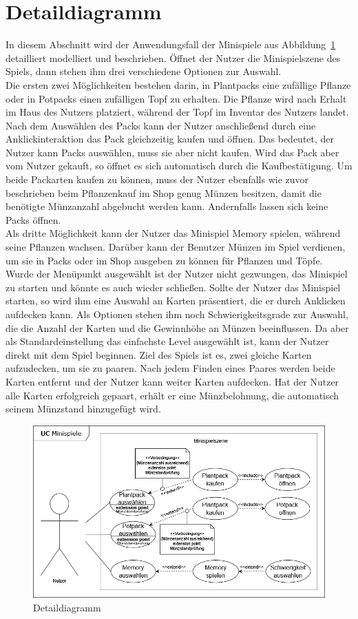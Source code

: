 \section{Detaildiagramm}\label{sec:detaildiagramme}
In diesem Abschnitt wird der Anwendungsfall der Minispiele aus Abbildung~\ref{fig:uc_detail} detailliert modelliert und 
beschrieben.
Öffnet der Nutzer die Minispielszene des Spiels, dann stehen ihm drei verschiedene Optionen zur Auswahl.\\
\newline
Die ersten zwei Möglichkeiten bestehen darin, in Plantpacks eine zufällige Pflanze oder in Potpacks einen zufälligen 
Topf zu erhalten. 
Die Pflanze wird nach Erhalt im Haus des Nutzers platziert, während der Topf im Inventar des Nutzers landet.
Nach dem Auswählen des Packs kann der Nutzer anschließend durch eine Anklickinteraktion das Pack gleichzeitig kaufen
und öffnen. 
Das bedeutet, der Nutzer kann Packs auswählen, muss sie aber nicht kaufen.
Wird das Pack aber vom Nutzer gekauft, so öffnet es sich automatisch durch die Kaufbestätigung. 
Um beide Packarten kaufen zu können, muss der Nutzer ebenfalls wie zuvor beschrieben beim Pflanzenkauf im Shop genug 
Münzen besitzen, damit die benötigte Münzanzahl abgebucht werden kann. 
Andernfalls lassen sich keine Packs öffnen.\\
\newpage
Als dritte Möglichkeit kann der Nutzer das Minispiel Memory spielen, während seine Pflanzen wachsen. 
Darüber kann der Benutzer Münzen im Spiel verdienen, um sie in Packs oder im Shop ausgeben zu können für Pflanzen und 
Töpfe.
Wurde der Menüpunkt ausgewählt ist der Nutzer nicht gezwungen, das Minispiel zu starten und könnte es auch wieder
schließen.
Sollte der Nutzer das Minispiel starten, so wird ihm eine Auswahl an Karten präsentiert, die er durch Anklicken
aufdecken kann.
Als Optionen stehen ihm noch Schwierigkeitsgrade zur Auswahl, die die Anzahl der Karten und die Gewinnhöhe an Münzen
beeinflussen.
Da aber als Standardeinstellung das einfachste Level ausgewählt ist, kann der Nutzer direkt mit dem Spiel beginnen.
Ziel des Spiels ist es, zwei gleiche Karten aufzudecken, um sie zu paaren.
Nach jedem Finden eines Paares werden beide Karten entfernt und der Nutzer kann weiter Karten aufdecken.
Hat der Nutzer alle Karten erfolgreich gepaart, erhält er eine Münzbelohnung, die automatisch seinem Münzstand
hinzugefügt wird. \\

\vspace{2cm}
\begin{figure}[h]
    \centering
    \includegraphics[width=\linewidth]{../bilder/uc_detail}
    \vspace{0.05cm}
    \caption{Detaildiagramm}
    \label{fig:uc_detail}
\end{figure}
